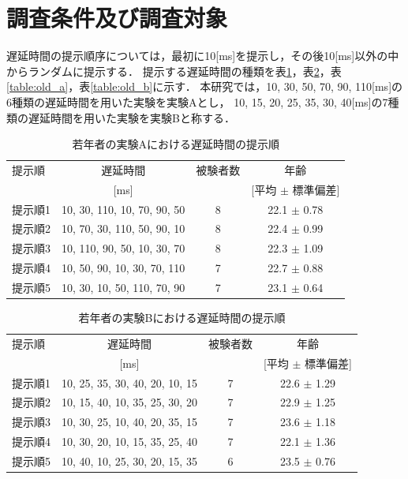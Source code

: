 \section{調査条件及び調査対象}
遅延時間の提示順序については，最初に10[ms]を提示し，その後10[ms]以外の中からランダムに提示する．
提示する遅延時間の種類を表\ref{table:young_a}，表\ref{table:young_b}，表\ref{table:old_a}，表\ref{table:old_b}に示す．
本研究では，10, 30, 50, 70, 90, 110[ms]の6種類の遅延時間を用いた実験を実験Aとし，
10, 15, 20, 25, 35, 30, 40[ms]の7種類の遅延時間を用いた実験を実験Bと称する．
\begin{table}[tbp]
  \caption{若年者の実験Aにおける遅延時間の提示順}
  \label{table:young_a}
  \centering
  \begin{tabular}{lccc}
    \hline
    提示順 & 遅延時間 & 被験者数 & 年齢\\
    　& [ms] & & [平均 $\pm$ 標準偏差]\\
    \hline \hline
    提示順1  & 10, 30, 110, 10, 70, 90, 50  & 8 & 22.1 $\pm$ 0.78\\
    提示順2  & 10, 70, 30, 110, 50, 90, 10  & 8 & 22.4 $\pm$ 0.99\\
    提示順3  & 10, 110, 90, 50, 10, 30, 70  & 8 & 22.3 $\pm$ 1.09\\
    提示順4  & 10, 50, 90, 10, 30, 70, 110  & 7 & 22.7 $\pm$ 0.88\\
    提示順5  & 10, 30, 10, 50, 110, 70, 90  & 7 & 23.1 $\pm$ 0.64
\\
    \hline
  \end{tabular}
\end{table}
\begin{table}[tbp]
  \caption{若年者の実験Bにおける遅延時間の提示順}
  \label{table:young_b}
  \centering
  \begin{tabular}{lccc}
    \hline
    提示順 & 遅延時間 & 被験者数 & 年齢\\
    　& [ms] & & [平均 $\pm$ 標準偏差]\\
    \hline \hline
    提示順1  & 10, 25, 35, 30, 40, 20, 10, 15  & 7 & 22.6 $\pm$ 1.29\\
    提示順2  & 10, 15, 40, 10, 35, 25, 30, 20  & 7 & 22.9 $\pm$ 1.25\\
    提示順3  & 10, 30, 25, 10, 40, 20, 35, 15  & 7 & 23.6 $\pm$ 1.18\\
    提示順4  & 10, 30, 20, 10, 15, 35, 25, 40  & 7 & 22.1 $\pm$ 1.36\\
    提示順5  & 10, 40, 10, 25, 30, 20, 15, 35  & 6 & 23.5 $\pm$ 0.76
\\
    \hline
  \end{tabular}
\end{table}
